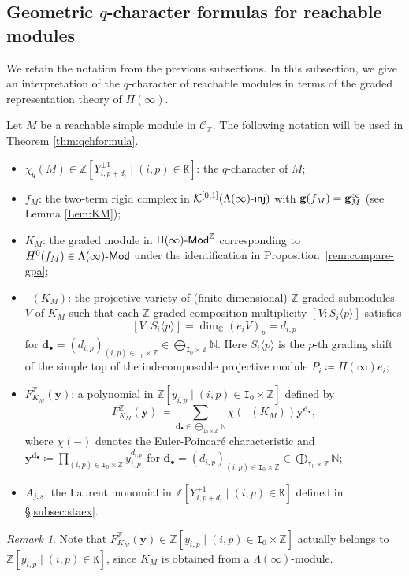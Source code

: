 \documentclass[12pt]{amsart}
\theoremstyle{definition}
\theoremstyle{remark}
\newtheorem{remark}[theorem]{Remark}
\numberwithin{equation}{section}
\newcommand{\injc}{\mathchar`-\mathsf{inj}}
\begin{document}
\subsection{Geometric $q$-character formulas for reachable modules}\label{subsec:qch}
We retain the notation from the previous subsections.
In this subsection, we give an interpretation of the $q$-character of reachable modules in terms of the graded representation theory of $\Pi(\infty)$.

Let $M$ be a reachable simple module in $\mathcal C_{\mathbb Z}$. The following notation will be used in Theorem \ref{thm:qchformula}.
\begin{itemize}
    \item $\chi_q(M)\in \mathbb{Z}[Y_{i,p+d_i}^{\pm 1} \mid (i,p) \in \mathtt K]$: the $q$-character of $M$;
    \item $f_M$: the two-term rigid complex in $\mathcal{K}^{[0,1]}(\Lambda(\infty)\injc)$ with ${\bf g}(f_M)={\bf g}_M^\infty$ (see Lemma \ref{Lem:KM});
    \item $K_M$: the graded module in $\Pi(\infty)\mathchar`-\mathsf{Mod}^\mathbb{Z}$ corresponding to $H^0(f_M)\in \Lambda(\infty)\mathchar`-\mathsf{Mod}$ under the identification in Proposition~\ref{rem:compare-gpa};
    \item $\mathop{\mathsf{Gr}^{\mathbb{Z}}_{\mathbf{d}_\bullet}}(K_M)$: the projective variety of (finite-dimensional) $\mathbb{Z}$-graded submodules $V$ of  $K_M$ such that each $\mathbb{Z}$-graded composition multiplicity $[V\colon S_i\langle p \rangle]$ satisfies
\[[V\colon S_i \langle p \rangle]= \dim_{\mathbb{C}}(e_i V)_p = d_{i,p}\]
for $\mathbf{d}_{\bullet}=(d_{i, p})_{(i,p)\in \mathtt{I}_0\times \mathbb{Z}}\in \bigoplus_{\mathtt{I}_0\times \mathbb{Z}}\mathbb{N}$. Here $S_i\langle p \rangle$ is the $p$-th grading shift of the simple top of the indecomposable projective module $P_i\coloneqq \Pi(\infty)e_i$;
\item $F^{\mathbb{Z}}_{K_M}(\mathbf{y})$: a polynomial in $
\mathbb{Z}[y_{i,p}\mid (i,p)\in \mathtt{I}_0\times \mathbb{Z}]$ 
  defined by
\[F^{\mathbb{Z}}_{K_M}(\mathbf{y})\coloneqq \sum_{\mathbf{d}_{\bullet}\in \bigoplus_{\mathtt I_0\times\mathbb Z}\mathbb N} \chi(\mathop{\mathsf{Gr}^{\mathbb{Z}}_{\mathbf{d}_{\bullet}}}(K_M))\mathbf{y}^{\mathbf{d}_\bullet},\]
where $\chi(-)$ denotes the Euler-Poincar\'e characteristic and $\mathbf{y}^{\mathbf{d}_\bullet}\coloneqq \prod_{(i,p)\in {\mathtt{I}_0\times \mathbb{Z}}}y_{i,p}^{d_{i,p}}$ for $\mathbf{d}_{\bullet}=(d_{i, p})_{(i,p)\in \mathtt{I}_0\times \mathbb{Z}}\in \bigoplus_{\mathtt{I}_0\times \mathbb{Z}}\mathbb{N}$;
\item $A_{j,s}$: the Laurent monomial in $\mathbb Z[Y_{i,p+d_i}^{\pm 1}\mid (i,p)\in \mathtt{K}]$ defined in 
 \S \ref{subsec:staex}.
\end{itemize}
\begin{remark}
Note that  $F^{\mathbb{Z}}_{K_M}(\mathbf{y})\in \mathbb{Z}[y_{i,p}\mid (i,p)\in \mathtt{I}_0\times \mathbb{Z}]$ actually belongs to $\mathbb{Z}[y_{i,p}\mid (i,p)\in \mathtt{K}]$, since $K_M$ is obtained from a $\Lambda(\infty)$-module.   
\end{remark}
\end{document}
